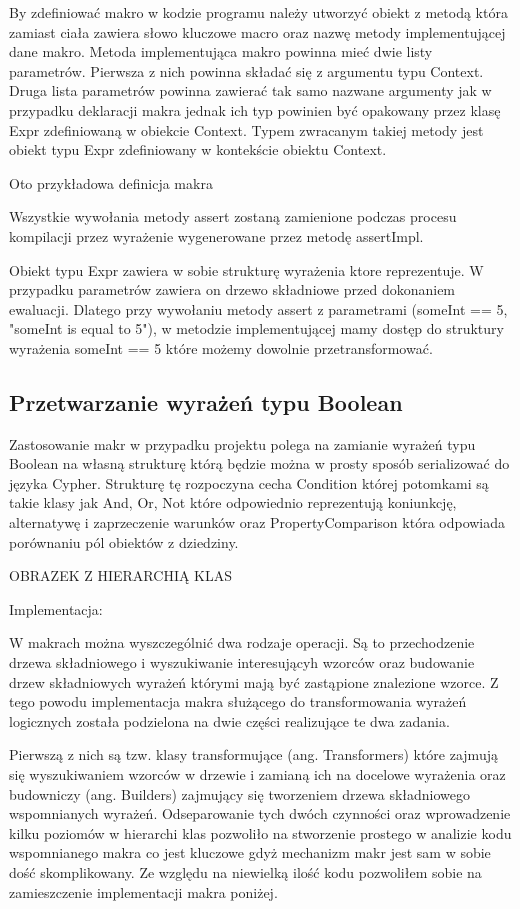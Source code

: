 \documentclass[brudnopis]{xmgr}
\begin{document}
By zdefiniować makro w kodzie programu należy utworzyć obiekt z metodą która zamiast ciała zawiera słowo kluczowe macro oraz nazwę metody implementującej dane makro.
Metoda implementująca makro powinna mieć dwie listy parametrów. Pierwsza z nich powinna składać się z argumentu typu Context. Druga lista parametrów powinna zawierać tak samo nazwane argumenty jak w przypadku deklaracji makra jednak ich typ powinien być opakowany przez klasę Expr zdefiniowaną w obiekcie Context. Typem zwracanym takiej metody jest obiekt typu Expr zdefiniowany w kontekście obiektu Context.

Oto przykładowa definicja makra



Wszystkie wywołania metody assert zostaną zamienione podczas procesu kompilacji przez wyrażenie wygenerowane przez metodę assertImpl. 

Obiekt typu Expr zawiera w sobie strukturę wyrażenia ktore reprezentuje. W przypadku parametrów zawiera on drzewo składniowe przed dokonaniem ewaluacji. Dlatego przy wywołaniu metody assert z parametrami (someInt == 5, "someInt is equal to 5"), w metodzie implementującej mamy dostęp do struktury wyrażenia someInt == 5 które możemy dowolnie przetransformować.

\subsection{Przetwarzanie wyrażeń typu Boolean}

Zastosowanie makr w przypadku projektu polega na zamianie wyrażeń typu Boolean na własną strukturę którą będzie można w prosty sposób serializować do języka Cypher. Strukturę tę rozpoczyna cecha Condition której potomkami są takie klasy jak And, Or, Not które odpowiednio reprezentują koniunkcję, alternatywę i zaprzeczenie warunków oraz PropertyComparison która odpowiada porównaniu pól obiektów z dziedziny.

OBRAZEK Z HIERARCHIĄ KLAS

Implementacja:

W makrach można wyszczególnić dwa rodzaje operacji. Są to przechodzenie drzewa składniowego i wyszukiwanie interesującyh wzorców oraz budowanie drzew składniowych wyrażeń którymi mają być zastąpione znalezione wzorce. Z tego powodu implementacja makra służącego do transformowania wyrażeń logicznych została podzielona na dwie części realizujące te dwa zadania.

Pierwszą z nich są tzw. klasy transformujące (ang. Transformers) które zajmują się wyszukiwaniem wzorców w drzewie i zamianą ich na docelowe wyrażenia oraz budowniczy (ang. Builders) zajmujący się tworzeniem drzewa składniowego wspomnianych wyrażeń. Odseparowanie tych dwóch czynności oraz wprowadzenie kilku poziomów w hierarchi klas pozwoliło na stworzenie prostego w analizie kodu wspomnianego makra co jest kluczowe gdyż mechanizm makr jest sam w sobie dość skomplikowany.  Ze względu na niewielką ilość kodu pozwoliłem sobie na zamieszczenie implementacji makra poniżej.
\end{document}
